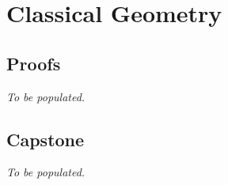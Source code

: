 \chapter{Classical Geometry}

\clearpage

\clearpage

\section*{Proofs}
\textit{To be populated.}

\section*{Capstone}
\textit{To be populated.}
